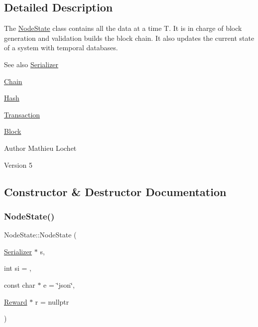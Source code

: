 \subsection{Detailed Description}
The \mbox{\hyperlink{classNodeState}{Node\+State}} class contains all the data at a time T. It is in charge of block generation and validation builds the block chain. It also updates the current state of a system with temporal databases. \begin{DoxySeeAlso}{See also}
\mbox{\hyperlink{classSerializer}{Serializer}} 

\mbox{\hyperlink{classChain}{Chain}} 

\mbox{\hyperlink{classHash}{Hash}} 

\mbox{\hyperlink{classTransaction}{Transaction}} 

\mbox{\hyperlink{classBlock}{Block}}
\end{DoxySeeAlso}
\begin{DoxyAuthor}{Author}
Mathieu Lochet 
\end{DoxyAuthor}
\begin{DoxyVersion}{Version}
5 
\end{DoxyVersion}


\subsection{Constructor \& Destructor Documentation}
\mbox{\label{classNodeState_ab8efdcd562f3122b88f0959f5e3b5fed}} 
\subsubsection{\texorpdfstring{Node\+State()}{NodeState()}}
{\footnotesize\ttfamily Node\+State\+::\+Node\+State (\begin{DoxyParamCaption}\item[{\mbox{\hyperlink{classSerializer}{Serializer}} $\ast$}]{s,  }\item[{int}]{si = {},  }\item[{const char $\ast$}]{e = {\ttfamily \char`\"{}json\char`\"{}},  }\item[{\mbox{\hyperlink{classReward}{Reward}} $\ast$}]{r = {\ttfamily nullptr} }\end{DoxyParamCaption})\hspace{0.3cm}{\ttfamily [explicit]}}

